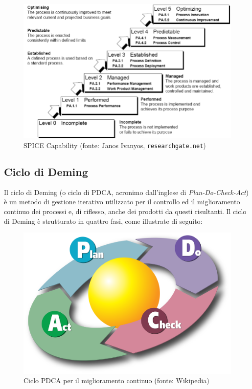 \begin{figure}[H]
		\centering
		\includegraphics[scale=0.5]{./res/img/ISO_IEC_15504.png}
		\caption[Modello ISO/IEC 15504]{SPICE Capability (fonte: Janos Ivanyos, \texttt{researchgate.net})}
\end{figure}
\pagebreak

\subsection{Ciclo di Deming}
Il ciclo di Deming (o ciclo di PDCA, acronimo dall'inglese di \textit{Plan-Do-Check-Act}) è un metodo di gestione iterativo utilizzato per il controllo ed il miglioramento continuo dei processi e, di riflesso, anche dei prodotti da questi risultanti. 
Il ciclo di Deming è strutturato in quattro fasi, come illustrate di seguito:
	\begin{figure}[H]
		\centering
		\includegraphics[scale=0.1]{./res/img/PDCA.png}
		\caption[Ciclo PDCA]{Ciclo PDCA per il miglioramento continuo (fonte: Wikipedia)}
	\end{figure}

